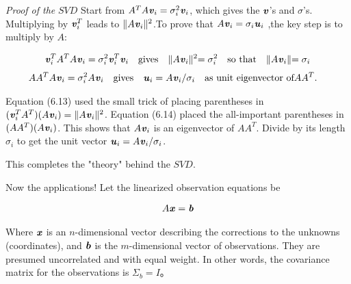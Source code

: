 \begin{flushleft}
	\textit{Proof of the} $SVD$   Start from $ A^{T}A\textbf{\textit{v}}_{i}=\sigma^{2}_{i}\textbf{\textit{v}}_{i}$, which gives the $\textbf{\textit{v}}$'s and $\sigma$'s. Multiplying
by $ \textbf{\textit{v}}^{T}_{i}$ leads to $ \lVert A\textbf{\textit{v}}_{i} \lVert ^{2}$.To prove that $ A\textbf{\textit{v}}_{i}=\sigma_{ i}\textbf{\textit{u}}_{i}$ ,the key step is to multiply by $A$:
\end{flushleft}
\begin{align}
\textbf{\textit{v}}^{T}_{i}A^{T}A\textbf{\textit{v}}_{i}=\sigma^{2}_{i}\textbf{\textit{v}}^{T}_{i}\textbf{\textit{v}}_{i}  & & \text{gives} & &     \lVert A\textbf{\textit{v}}_{i} \lVert^{2}=\sigma^{2}_{i}
 &  & \text{so that} & & \lVert  A\textbf{\textit{v}}_{i} \lVert = \sigma_{i}
\end{align}
\begin{align}
AA^{T}A\textbf{\textit{v}}_{i}=\sigma^{ 2}_{i}A\textbf{\textit{v}}_{i} & & \text{gives} & & \textbf{\textit{u}}_{i}=A\textbf{\textit{v}}_{i}/\sigma_{ i} & & \text{as unit eigenvector of} & AA^{T}.
\end{align}

\begin{flushleft}
	Equation (6.13) used the small trick of placing parentheses in $(\textbf{\textit{v}}^{T}_{i}A^{T})(A\textbf{\textit{v}}_{i})=\lVert A\textbf{\textit{v}}_{i} \lVert ^{2}$.
Equation (6.14) placed the all-important parentheses in $(AA^{T})(A\textbf{\textit{v}}_{i}) $. This shows that $A\textbf{\textit{v}}_{i}$ is an eigenvector of $AA^{T}$. Divide by its length $ \sigma_{i}$ to get the unit vector $\textbf{\textit{u}}_{i}=A\textbf{\textit{v}}_{i}/\sigma_{ i} $.
\end{flushleft}

This completes the "theory" behind the $SVD$.

\begin{flushleft}
	Now the applications! Let the linearized observation equations be
\end{flushleft}
\begin{align}
A\textbf{\textit{x}}=\textbf{\textit{b}}
\end{align}

\begin{flushleft}
	Where $\textbf{\textit{x}}$ is an $n$-dimensional vector describing the corrections to the unknowns (coordinates), and $\textbf{\textit{b}}$ is the $m$-dimensional vector of observations. They are presumed uncorrelated and with equal weight. In other words, the covariance matrix for the observations is $ \Sigma_{b}=I$。
\end{flushleft}

